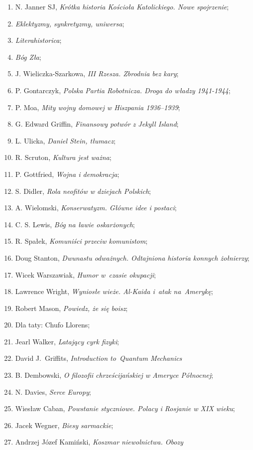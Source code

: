 \documentclass[a4paper,11pt]{article}
\begin{document}
\begin{enumerate}
\item N. Janner SJ, \emph{Krótka historia Kościoła Katolickiego. Nowe
    spojrzenie};
\item \emph{Eklektyzmy, synkretyzmy, uniwersa};
\item \emph{Literahistorica};
\item \emph{Bóg Zła};
\item J. Wieliczka-Szarkowa, \emph{III Rzesza. Zbrodnia bez kary};
\item P. Gontarczyk, \emph{Polska Partia Robotnicza. Droga do władzy
    1941-1944};
\item P. Moa, \emph{Mity wojny domowej w Hiszpania 1936--1939};
\item G. Edward Griffin, \emph{Finansowy potwór z Jekyll Island};
\item L. Ulicka, \emph{Daniel Stein, tłumacz};
\item R. Scruton, \emph{Kultura jest ważna};
\item P. Gottfried, \emph{Wojna i demokracja};
\item S. Didler, \emph{Rola neofitów w dziejach Polskich};
\item A. Wielomski, \emph{Konserwatyzm. Główne idee i postaci};
\item C. S. Lewis, \emph{Bóg na ławie oskarżonych};
\item R. Spałek, \emph{Komuniści przeciw komunistom};
\item Doug Stanton, \emph{Dwunastu odważnych. Odtajniona historia
    konnych żołnierzy};
\item Wicek Warszawiak, \emph{Humor w~czasie okupacji};
\item Lawrence Wright, \emph{Wyniosłe wieże. Al-Kaida i~atak
    na~Amerykę};
\item Robert Mason, \emph{Powiedz, że się boisz};
\item Dla taty: Chufo Llorens;
\item Jearl Walker, \emph{Latający cyrk fizyki};
\item David J.~Griffits, \emph{Introduction to~Quantum Mechanics}
\item B. Dembowski, \emph{O filozofii chrześcijańskiej w Ameryce
    Północnej};
\item N. Davies, \emph{Serce Europy};
\item Wiesław Caban, \emph{Powstanie styczniowe. Polacy i Rosjanie w
    XIX wieku};
\item Jacek Wegner, \emph{Biesy sarmackie};
\item Andrzej Józef Kamiński, \emph{Koszmar niewolnictwa. Obozy
}
\end{enumerate}
\end{document}
